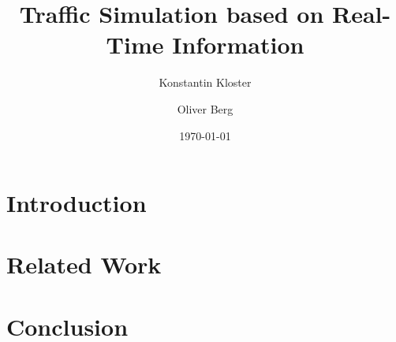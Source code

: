 \documentclass[10pt, oneside]{article}
\title{Traffic Simulation based on Real-Time Information}
\author[]{Konstantin Kloster}
\author[]{Oliver Berg}
\affil[1]{Technische Universität Kaiserslautern}
\date{\today}
\begin{document}
\maketitle



\begin{abstract}
    \lipsum[1]
\end{abstract}


\section{Introduction}
    \lipsum[2]


\newpage
\section{Related Work}
    \lipsum[3]
    \cite{brakewood2018literature}
    \cite{ksontini2016building}
    \cite{mastio2015towards}
    \cite{zargayouna2013agent}


\newpage
\section{Conclusion}
    \lipsum[4] 



\newpage



\end{document}
